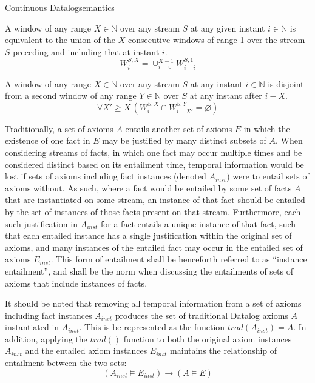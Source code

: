 \begin{nestedsection}{Continuous Datalog}{semantics}
\begin{axiom}
\label{axiom:continuous datalog: window composition}
A window of any range ${X \in \mathbb{N}}$ over any stream $S$ at any
given instant ${i \in \mathbb{N}}$ is equivalent to the union of the
$X$ consecutive windows of range 1 over the stream $S$ preceding and
including that at instant $i$.
\begin{equation*}
W^{S,X}_{i} = \mathop{\cup}_{i=0}^{X-1} W^{S,1}_{i-i}
\end{equation*}
\end{axiom}

\begin{axiom}
\item\label{axiom:continuous datalog: window disjointness}
A window of any range ${X \in \mathbb{N}}$ over any stream $S$ at any
instant ${i \in \mathbb{N}}$ is disjoint from a second window of any
range ${Y \in \mathbb{N}}$ over $S$ at any instant after ${i - X}$.
\begin{equation*}
\forall X' \geq X \, \left( W^{S,X}_{i} \cap W^{S,Y}_{i-X'} = \varnothing \right)
\end{equation*}
\end{axiom}

	Traditionally, a set of axioms $A$ entails another set of axioms $E$ in which the existence of one fact in $E$ may be justified by many distinct subsets of $A$.
	When considering streams of facts, in which one fact may occur multiple times and be considered distinct based on its entailment time, temporal information would be lost if sets of axioms including fact instances (denoted $A_{inst}$) were to entail sets of axioms without.
	As such, where a fact would be entailed by some set of facts $A$ that are instantiated on some stream, an instance of that fact should be entailed by the set of instances of those facts present on that stream.
	Furthermore, each such justification in $A_{inst}$ for a fact entails a unique instance of that fact, such that each entailed instance has a single justification within the original set of axioms, and many instances of the entailed fact may occur in the entailed set of axioms $E_{inst}$.
	This form of entailment shall be henceforth referred to as ``instance entailment'', and shall be the norm when discussing the entailments of sets of axioms that include instances of facts.
	
	It should be noted that removing all temporal information from a set of axioms including fact instances $A_{inst}$ produces the set of traditional Datalog axioms $A$ instantiated in $A_{inst}$.
	This is be represented as the function ${trad\left( A_{inst} \right) = A}$.
	In addition, applying the ${trad()}$ function to both the original axiom instances $A_{inst}$ and the entailed axiom instances $E_{inst}$ maintains the relationship of entailment between the two sets:
	\[ \left( A_{inst} \vDash E_{inst} \right) \rightarrow \left( A \vDash E \right) \]


\end{nestedsection}

